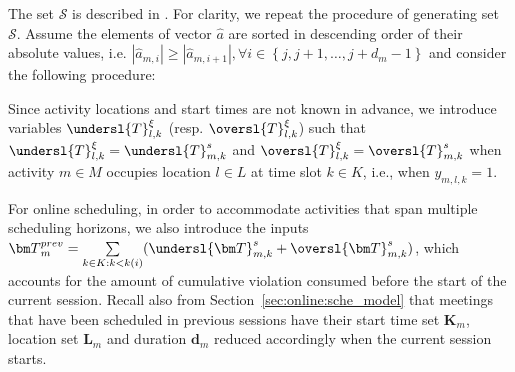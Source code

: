 The set $\mathcal{S}$ is described in \cite[Proposition 1.]{hijazi2013robust}. 
For clarity, we repeat the procedure of generating set $\mathcal{S}$. 
%
Assume the elements of vector $\hat{a}$ are sorted in descending order of their absolute values, i.e. $|\hat{a}_{m,i}| \geq \left|\hat{a}_{m,i+1}\right|, \forall i \in \left\{j, j+1, \ldots, j+d_m-1\right\}$ and consider the following procedure:

\vspace{10pt}
\begin{algorithm}[H]
\end{algorithm}
\vspace{10pt}




Since activity locations and start times are not known in advance, we introduce variables $\undersl{T}^{\xi}_{l,k}$ (resp. $\oversl{T}^{\xi}_{l,k}$) such that $\undersl{T}^{\xi}_{l,k} = \undersl{T}^{s}_{m,k}$ and $\oversl{T}^{\xi}_{l,k} = \oversl{T}^{s}_{m,k}$ when activity $m\in M$ occupies location $l\in L$ at time slot $k \in K$, i.e., when $y_{m,l,k} = 1$.

For online scheduling, in order to accommodate activities that span multiple scheduling horizons, we also introduce the inputs ${\bm T}^{prev}_{m} = \mathop{\sum \limits_{k \in K: k< k(i)}} (\undersl{\bm T}^s_{m,k} + \oversl{\bm T}^s_{m,k})$, which accounts for the amount of cumulative violation consumed before the start of the current session. Recall also from Section~\ref{sec:online:sche_model} that meetings that have been scheduled in previous sessions have their start time set ${\bm K}_m$, location set ${\bm  L}_m$ and duration ${\bm d}_m$ reduced accordingly when the current session starts. 

